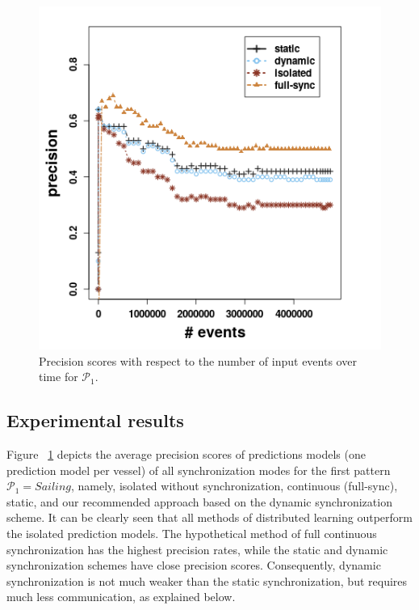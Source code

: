 \begin{figure}[h]
	
	\includegraphics[width=\textwidth]{chapters/figures/precision_p1.png}
	
	\caption{Precision scores with respect to the number of input events over time for $\mathcal{P}_1$.}
	\label{fig:precsions}
\end{figure}

\subsection*{Experimental results} Figure ~\ref{fig:precsions} depicts the average precision scores of predictions models (one prediction model per vessel) of all synchronization modes for the first pattern $\mathcal{P}_1=Sailing$, namely, isolated without synchronization, continuous (full-sync), static, and our recommended approach based on the dynamic synchronization scheme. It can be clearly seen that all methods of distributed learning outperform the isolated prediction models. The hypothetical method of full continuous synchronization has the highest precision rates, while the static and dynamic synchronization schemes have close precision scores. Consequently, dynamic synchronization is not much weaker than the static synchronization, but requires much less communication, as explained below.
 

